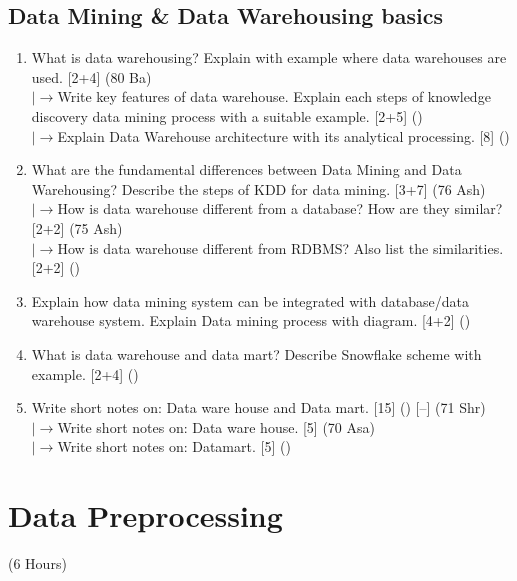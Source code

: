 \documentclass[12pt]{article}
\newcommand{\lb}{\\$\left|\rightarrow\right.$}
\begin{document}
  \subsection{Data Mining \& Data Warehousing basics}
    \begin{enumerate}[topsep=0pt, noitemsep]
      \item What is data warehousing? Explain with example where data warehouses are used. \hfill [2+4] (80 Ba)
        \lb Write key features of data warehouse. Explain each steps of knowledge discovery data mining process with a suitable example. \hfill [2+5] ()
        \lb Explain Data Warehouse architecture with its analytical processing. \hfill [8] ()

      \item What are the fundamental differences between Data Mining and Data Warehousing? Describe the steps of KDD for data mining. \hfill [3+7] (76 Ash)
        \lb How is data warehouse different from a database? How are they similar? \hfill [2+2] (75 Ash)
        \lb How is data warehouse different from RDBMS? Also list the similarities. \hfill [2+2] ()

      \item Explain how data mining system can be integrated with database/data warehouse system. Explain Data mining process with diagram. \hfill [4+2] ()

      \item What is data warehouse and data mart? Describe Snowflake scheme with example. \hfill [2+4] ()

      \item Write short notes on: Data ware house and Data mart. \hfill [15] () [--] (71 Shr)
        \lb Write short notes on: Data ware house. \hfill [5] (70 Asa)
        \lb Write short notes on: Datamart. \hfill [5] ()
    \end{enumerate}

\pagebreak
\section{Data Preprocessing}
\begin{center}(6 Hours)\end{center}
\end{document}
